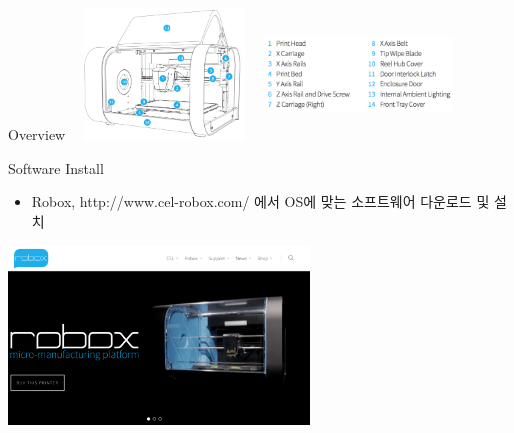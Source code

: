 \documentclass[11pt]{beamer}
\begin{document}
\begin{frame}[t]{Overview}\footnotesize
\centering
\includegraphics[width=5cm, height=3.5cm]{./image/17_02.png}
\includegraphics[width=5cm, height=3.5cm]{./image/17_03.png}
\end{frame}

\begin{frame}[t]{Software Install}\footnotesize
\begin{itemize}
\item Robox, http://www.cel-robox.com/ 에서 OS에 맞는 소프트웨어 다운로드 및 설치
\end{itemize}
\centering
\includegraphics[width=8cm]{./image/17_14.png}
\end{frame}
\end{document}
